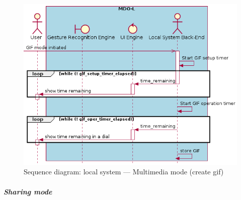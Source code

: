 \begin{figure}[htb!]
  \centering
  \includegraphics[width=0.55\columnwidth]{./img/seq-local-multimedia-mode-create-gif.png}
  \caption{Sequence diagram: local system --- Multimedia mode (create \gls{gif})}%
\label{fig:seq-local-multimedia-mode-create-gif}
\end{figure}

\paragraph{\emph{Sharing mode}}


